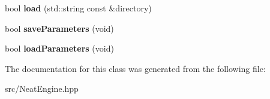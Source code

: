 \begin{DoxyCompactItemize}
\item 
\mbox{\label{class_indie_neat_1_1_neat_engine_a7f866b4bd2279a1d3b89b450e45b6d6e}} 
bool {\bfseries load} (std\+::string const \&directory)
\item 
\mbox{\label{class_indie_neat_1_1_neat_engine_af0bcb45cfa2e9576c5fbd58618267450}} 
bool {\bfseries save\+Parameters} (void)
\item 
\mbox{\label{class_indie_neat_1_1_neat_engine_ae44c81e06890ebce798f33c82bf6b2ee}} 
bool {\bfseries load\+Parameters} (void)
\end{DoxyCompactItemize}


The documentation for this class was generated from the following file\+:\begin{DoxyCompactItemize}
\item 
src/Neat\+Engine.\+hpp\end{DoxyCompactItemize}
